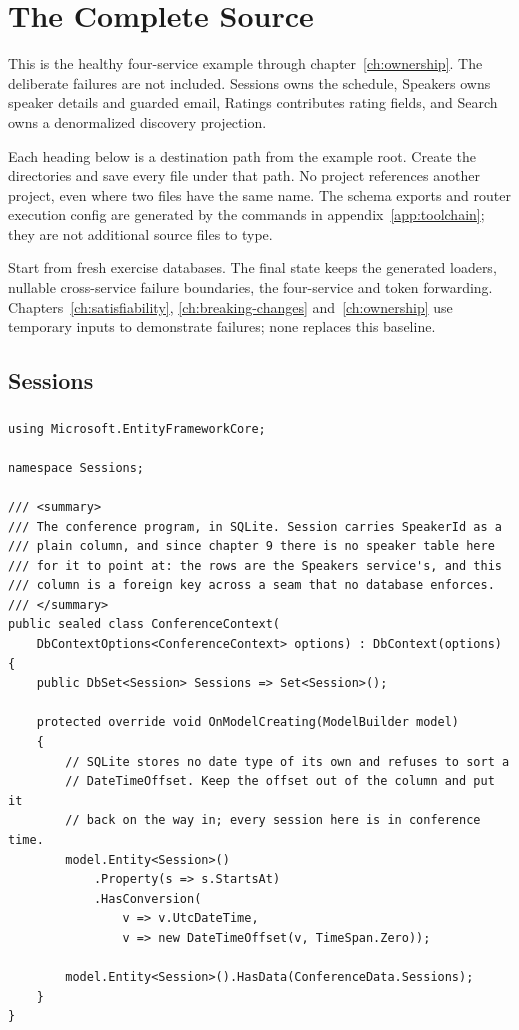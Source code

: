 \chapter{The Complete Source}
\label{app:source}

This is the healthy four-service example through chapter~\ref{ch:ownership}.
The deliberate failures are not included. Sessions owns the schedule,
Speakers owns speaker details and guarded email, Ratings contributes rating
fields, and Search owns a denormalized discovery projection.

Each heading below is a destination path from the example root. Create the
directories and save every file under that path. No project references
another project, even where two files have the same name. The schema exports
and router execution config are generated by the commands in
appendix~\ref{app:toolchain}; they are not additional source files to type.

Start from fresh exercise databases. The final state keeps the generated
loaders, nullable cross-service failure boundaries, the four-service
 and token forwarding. Chapters~\ref{ch:satisfiability},
\ref{ch:breaking-changes} and~\ref{ch:ownership} use temporary inputs to
demonstrate failures; none replaces this baseline.

\section{Sessions}

\subsection*{}
\begin{verbatim}
using Microsoft.EntityFrameworkCore;

namespace Sessions;

/// <summary>
/// The conference program, in SQLite. Session carries SpeakerId as a
/// plain column, and since chapter 9 there is no speaker table here
/// for it to point at: the rows are the Speakers service's, and this
/// column is a foreign key across a seam that no database enforces.
/// </summary>
public sealed class ConferenceContext(
    DbContextOptions<ConferenceContext> options) : DbContext(options)
{
    public DbSet<Session> Sessions => Set<Session>();

    protected override void OnModelCreating(ModelBuilder model)
    {
        // SQLite stores no date type of its own and refuses to sort a
        // DateTimeOffset. Keep the offset out of the column and put it
        // back on the way in; every session here is in conference time.
        model.Entity<Session>()
            .Property(s => s.StartsAt)
            .HasConversion(
                v => v.UtcDateTime,
                v => new DateTimeOffset(v, TimeSpan.Zero));

        model.Entity<Session>().HasData(ConferenceData.Sessions);
    }
}
\end{verbatim}

